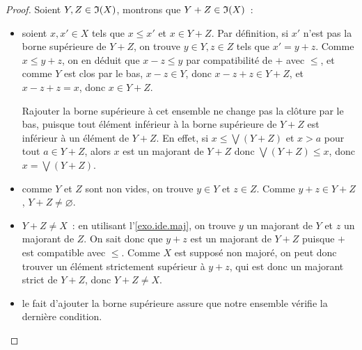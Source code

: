 \begin{proof}
  Soient $Y,Z\in \mathfrak{I}(X)$, montrons que $Y + Z \in \mathfrak{I}(X)$~:
  \begin{itemize}
  \item soient $x,x'\in X$ tels que $x\leq x'$ et $x\in Y + Z$. Par définition,
    si $x'$ n'est pas la borne supérieure de $Y + Z$, on trouve $y\in Y,z \in Z$
    tels que $x' = y + z$. Comme $x \leq y + z$, on en déduit que $x - z \leq y$
    par compatibilité de $+$ avec $\leq$, et comme $Y$ est clos par le bas,
    $x - z \in Y$, donc $x - z + z \in Y + Z$, et $x - z + z = x$, donc
    $x \in Y + Z$.

    Rajouter la borne supérieure à cet ensemble ne change pas la clôture par le
    bas, puisque tout élément inférieur à la borne supérieure de $Y + Z$ est
    inférieur à un élément de $Y + Z$. En effet, si $x \leq \bigvee(Y + Z)$ et
    $x > a$ pour tout $a \in Y + Z$, alors $x$ est un majorant de $Y + Z$ donc
    $\bigvee(Y + Z) \leq x$, donc $x = \bigvee (Y + Z)$.
  \item comme $Y$ et $Z$ sont non vides, on trouve $y\in Y$ et $z\in Z$. Comme
    $y + z \in Y + Z$, $Y + Z \neq \varnothing$.
  \item $Y + Z \neq X$~: en utilisant l'\cref{exo.ide.maj}, on trouve
    $y$ un majorant de $Y$ et $z$ un majorant de $Z$. On sait donc que
    $y + z$ est un majorant de $Y + Z$ puisque $+$ est compatible avec $\leq$.
    Comme $X$ est supposé non majoré, on peut donc trouver un élément
    strictement supérieur à $y + z$, qui est donc un majorant strict de $Y + Z$,
    donc $Y + Z \neq X$.
  \item le fait d'ajouter la borne supérieure assure que notre ensemble vérifie
    la dernière condition.
  \end{itemize}


\end{proof}
